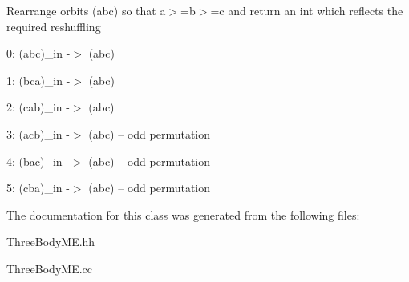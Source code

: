 Rearrange orbits (abc) so that a$>$=b$>$=c and return an int which reflects the required reshuffling
\begin{DoxyItemize}
\item 0\+: (abc)\+\_\+in -\/$>$ (abc)
\item 1\+: (bca)\+\_\+in -\/$>$ (abc)
\item 2\+: (cab)\+\_\+in -\/$>$ (abc)
\item 3\+: (acb)\+\_\+in -\/$>$ (abc) -- odd permutation
\item 4\+: (bac)\+\_\+in -\/$>$ (abc) -- odd permutation
\item 5\+: (cba)\+\_\+in -\/$>$ (abc) -- odd permutation 
\end{DoxyItemize}

The documentation for this class was generated from the following files\+:\begin{DoxyCompactItemize}
\item 
Three\+Body\+M\+E.\+hh\item 
Three\+Body\+M\+E.\+cc\end{DoxyCompactItemize}
